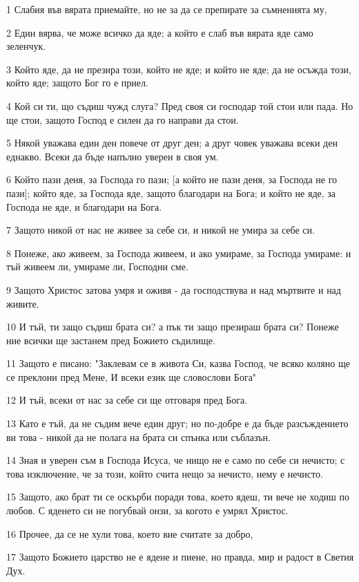 \par 1 Слабия във вярата приемайте, но не за да се препирате за съмненията му,
\par 2 Един вярва, че може всичко да яде; а който е слаб във вярата яде само зеленчук.
\par 3 Който яде, да не презира този, който не яде; и който не яде; да не осъжда този, който яде; защото Бог го е приел.
\par 4 Кой си ти, що съдиш чужд слуга? Пред своя си господар той стои или пада. Но ще стои, защото Господ е силен да го направи да стои.
\par 5 Някой уважава един ден повече от друг ден; а друг човек уважава всеки ден еднакво. Всеки да бъде напълно уверен в своя ум.
\par 6 Който пази деня, за Господа го пази; [а който не пази деня, за Господа не го пази]; който яде, за Господа яде, защото благодари на Бога; и който не яде, за Господа не яде, и благодари на Бога.
\par 7 Защото никой от нас не живее за себе си, и никой не умира за себе си.
\par 8 Понеже, ако живеем, за Господа живеем, и ако умираме, за Господа умираме: и тъй живеем ли, умираме ли, Господни сме.
\par 9 Защото Христос затова умря и оживя - да господствува и над мъртвите и над живите.
\par 10 И тъй, ти защо съдиш брата си? а пък ти защо презираш брата си? Понеже ние всички ще застанем пред Божието съдилище.
\par 11 Защото е писано: "Заклевам се в живота Си, казва Господ, че всяко коляно ще се преклони пред Мене, И всеки език ще словослови Бога"
\par 12 И тъй, всеки от нас за себе си ще отговаря пред Бога.
\par 13 Като е тъй, да не съдим вече един друг; но по-добре е да бъде разсъждението ви това - никой да не полага на брата си спънка или съблазън.
\par 14 Зная и уверен съм в Господа Исуса, че нищо не е само по себе си нечисто; с това изключение, че за този, който счита нещо за нечисто, нему е нечисто.
\par 15 Защото, ако брат ти се оскърби поради това, което ядеш, ти вече не ходиш по любов. С яденето си не погубвай онзи, за когото е умрял Христос.
\par 16 Прочее, да се не хули това, което вие считате за добро,
\par 17 Защото Божието царство не е ядене и пиене, но правда, мир и радост в Светия Дух.

